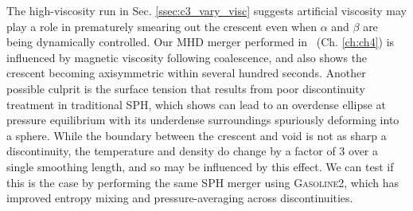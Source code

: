 The high-viscosity run in Sec. \ref{ssec:c3_vary_visc} suggests artificial viscosity may play a role in prematurely smearing out the crescent even when $\alpha$ and $\beta$ are being dynamically controlled.  Our MHD merger performed in \arepo\ (Ch. \ref{ch:ch4}) is influenced by magnetic viscosity following coalescence, and also shows the crescent becoming axisymmetric within several hundred seconds.  Another possible culprit is the surface tension that results from poor discontinuity treatment in traditional SPH, which \cite{hesss10} shows can lead to an overdense ellipse at pressure equilibrium with its underdense surroundings spuriously deforming into a sphere.  While the boundary between the crescent and void is not as sharp a discontinuity, the temperature and density do change by a factor of $3$ over a single smoothing length, and so may be influenced by this effect.  We can test if this is the case by performing the same SPH merger using \textsc{Gasoline2}, which has improved entropy mixing and pressure-averaging across discontinuities.



